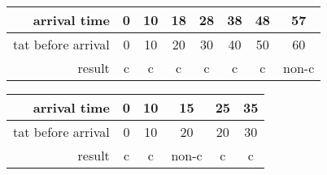\begin{table}[htbp]
        \begin{center}
        \begin{tabular}{|r||c|c|c|c|c|c|c|}
                \hline
                arrival time & 0 & 10 & 18 & 28 & 38 & 48 & 57  \\
                \hline
                tat before arrival & 0 & 10 & 20 & 30 & 40 & 50 & 60  \\
                \hline
                result & c &  c  &  c  & c  &
                c  & c &
                non-c   \\
                \hline
        \end{tabular}
         \end{center}
        \begin{center}
        \begin{tabular}{|r||c|c|c|c|c|}
                \hline
                arrival time & 0 & 10 & 15 & 25 & 35  \\
                \hline
                tat before arrival & 0 & 10 & 20 & 20 & 30  \\
                \hline
                result & c &  c  &  non-c  & c  &  c   \\
                \hline
        \end{tabular}
        \end{center}
        \protect{}
\end{table}

